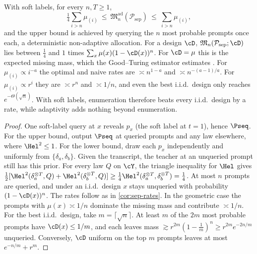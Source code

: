 \begin{corollary}\label{cor:sep-soft}
\Pv\Ck With soft labels, for every $n,T\ge1$,
\[
\tfrac14\sum_{i>n}\mu_{(i)}\ \le\ \mathfrak M^{\mathrm{ad}}_n(\mathcal P_{\mathrm{sep}})\ \le\ \sum_{i>n}\mu_{(i)},
\]
and the upper bound is achieved by querying the $n$ most probable prompts once each, a deterministic
non-adaptive allocation. For a design $\cD$, $\mathfrak M_n(\mathcal P_{\mathrm{sep}};\cD)$ lies between $\frac14$ and $1$
times $\sum_x\mu(x)(1-\cD(x))^n$. For $\cD=\mu$ this is the expected missing mass, which the Good--Turing
estimator estimates \citep{good1953population}. For $\mu_{(i)}\propto i^{-a}$ the optimal and naive rates are
$\asymp n^{1-a}$ and $\asymp n^{-(a-1)/a}$. For $\mu_{(i)}\propto r^i$ they are $\asymp r^n$ and $\asymp1/n$, and even the best
i.i.d.\ design only reaches $e^{-\Theta(\sqrt n)}$. With soft labels, enumeration therefore beats every i.i.d.\
design by a rate, while adaptivity adds nothing beyond enumeration.
\end{corollary}
\begin{proof}
One soft-label query at $x$ reveals $p_x$ (the soft label at $t=1$), hence $\Pseq$. For the upper bound,
output $\Pseq$ at queried prompts and any law elsewhere, where $\Hel^2\le1$. For the lower bound, draw each
$p_x$ independently and uniformly from $\{\delta_a,\delta_b\}$. Given the transcript, the teacher at an
unqueried prompt still has this prior. For every law $Q$ on $\cY$, the triangle inequality for $\Hel$ gives
$\frac12[\Hel^2(\delta_a^{\otimes T},Q)+\Hel^2(\delta_b^{\otimes T},Q)]\ge\frac14\Hel^2(\delta_a^{\otimes T},\delta_b^{\otimes T})=\frac14$. At
most $n$ prompts are queried, and under an i.i.d.\ design $x$ stays unqueried with probability $(1-\cD(x))^n$.
The rates follow as in \cref{cor:sep-rates}. In the geometric case the prompts with $\mu(x)\asymp1/n$
dominate the missing mass and contribute $\asymp1/n$. For the best i.i.d.\ design, take $m=\lceil\sqrt n\rceil$.
At least $m$ of the $2m$ most probable prompts have $\cD(x)\le1/m$, and each leaves mass
$\gtrsim r^{2m}(1-\frac1m)^n\ge r^{2m}e^{-2n/m}$ unqueried. Conversely, $\cD$ uniform on the top $m$ prompts leaves
at most $e^{-n/m}+r^m$.
\end{proof}

